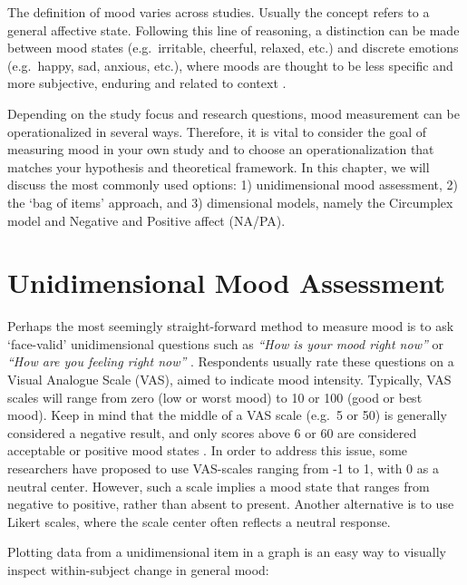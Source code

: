 \documentclass[]{book}
\begin{document}
 
 The definition of mood varies across
studies. Usually the concept refers to a general affective state.
Following this line of reasoning, a distinction can be made between mood
states (e.g.~irritable, cheerful, relaxed, etc.) and discrete emotions
(e.g.~happy, sad, anxious, etc.), where moods are thought to be less
specific and more subjective, enduring and related to context
\citep{Beedie2005, Cranford2006, Desmet2016}.

Depending on the study focus and research questions, mood measurement
can be operationalized in several ways. Therefore, it is vital to
consider the goal of measuring mood in your own study and to choose an
operationalization that matches your hypothesis and theoretical
framework. In this chapter, we will discuss the most commonly used
options: 1) unidimensional mood assessment, 2) the `bag of items'
approach, and 3) dimensional models, namely the Circumplex model and
Negative and Positive affect (NA/PA).

\section{Unidimensional Mood
Assessment}\label{unidimensional-mood-assessment}

 Perhaps the most seemingly
straight-forward method to measure mood is to ask `face-valid'
unidimensional questions such as \emph{``How is your mood right now''}
\citep{VanBallegooijen2016} or \emph{``How are you feeling right now''}
\citep{VandeVen2017}. Respondents usually rate these questions on a
Visual Analogue Scale (VAS), aimed to indicate mood intensity.
Typically, VAS scales will range from zero (low or worst mood) to 10 or
100 (good or best mood). Keep in mind that the middle of a VAS scale
(e.g.~5 or 50) is generally considered a negative result, and only
scores above 6 or 60 are considered acceptable or positive mood states
\citep{Groot2010}. In order to address this issue, some researchers have
proposed to use VAS-scales ranging from -1 to 1, with 0 as a neutral
center. However, such a scale implies a mood state that ranges from
negative to positive, rather than absent to present. Another alternative
is to use Likert scales, where the scale center often reflects a neutral
response.

Plotting data from a unidimensional item in a graph is an easy way to
visually inspect within-subject change in general mood:
\end{document}
